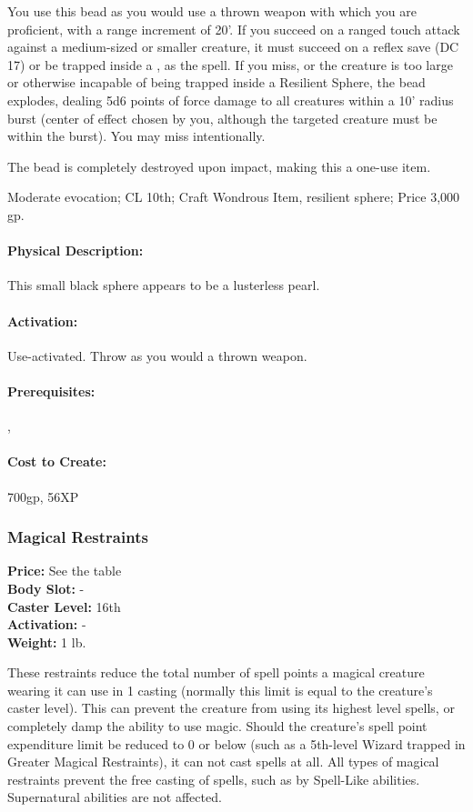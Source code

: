 You use this bead as you would use a thrown weapon with which you are proficient, with a range increment of 20'. If you succeed on a ranged touch attack against a medium-sized or smaller creature, it must succeed on a reflex save (DC 17) or be trapped inside a , as the spell.
If you miss, or the creature is too large or otherwise incapable of being trapped inside a Resilient Sphere, the bead explodes, dealing 5d6 points of force damage to all creatures within a 10' radius burst (center of effect chosen by you, although the targeted creature must be within the burst). You may miss intentionally.

The bead is completely destroyed upon impact, making this a one-use item.

Moderate evocation; CL 10th; Craft Wondrous Item, resilient sphere; Price 3,000 gp.

\paragraph{Physical Description:} This small black sphere appears to be a lusterless pearl.

\paragraph{Activation:} Use-activated. Throw as you would a thrown weapon.

\paragraph{Prerequisites:} , 

\paragraph{Cost to Create:} 700gp, 56XP
\subsubsection{Magical Restraints}
\textbf{Price:} See the  table\\
\textbf{Body Slot:} -\\
\textbf{Caster Level:} 16th\\
\textbf{Activation:} -\\
\textbf{Weight:} 1 lb.

These restraints reduce the total number of spell points a magical creature wearing it can use in 1 casting (normally this limit is equal to the creature's caster level). This can prevent the creature from using its highest level spells, or completely damp the ability to use magic. Should the creature's spell point expenditure limit be reduced to 0 or below (such as a 5th-level Wizard trapped in Greater Magical Restraints), it can not cast spells at all.
All types of magical restraints prevent the free casting of spells, such as by Spell-Like abilities. Supernatural abilities are not affected.

